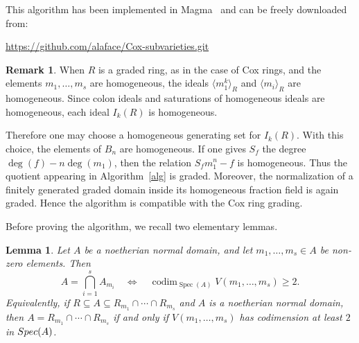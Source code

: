 \documentclass{amsart}
\newtheorem{lemma}[theorem]{Lemma}
\theoremstyle{definition}
\newtheorem{remark}[theorem]{Remark}
\theoremstyle{remark}
\begin{document}
\medskip

This algorithm has been implemented in Magma~\cite{magma} and can be freely
downloaded from:
\begin{center}
 \url{https://github.com/alaface/Cox-subvarieties.git}
\end{center}

\begin{remark}
When $R$ is a graded ring, as in the case of Cox rings, and the elements
$m_1,\dots,m_s$ are homogeneous, the ideals $\langle m_1^k\rangle_R$ and
$\langle m_i\rangle_R$ are homogeneous. Since colon ideals and saturations of
homogeneous ideals are homogeneous, each ideal $I_k(R)$ is homogeneous.

Therefore one may choose a homogeneous generating set for $I_k(R)$. With this
choice, the elements of $B_n$ are homogeneous. If one gives $S_f$ the degree
$\deg(f)-n\deg(m_1)$, then the relation $S_fm_1^n-f$ is homogeneous.
Thus the quotient appearing in Algorithm~\ref{alg} is graded. Moreover, the
normalization of a finitely generated graded domain inside its homogeneous
fraction field is again graded. Hence the algorithm is compatible with the Cox
ring grading.
\end{remark}

Before proving the algorithm, we recall two elementary lemmas.

\begin{lemma}
\label{pro:crit}
Let $A$ be a noetherian normal domain, and let $m_1,\dots,m_s\in A$ be
non-zero elements. Then
\[
A=\bigcap_{i=1}^s A_{m_i}
\quad\Longleftrightarrow\quad
\operatorname{codim}_{\operatorname{Spec}(A)}V(m_1,\dots,m_s)\ge 2.
\]
Equivalently, if $R\subseteq A\subseteq R_{m_1}\cap\cdots\cap R_{m_s}$ and
$A$ is a noetherian normal domain, then $A=R_{m_1}\cap\cdots\cap R_{m_s}$
if and only if $V(m_1,\dots,m_s)$ has codimension at least $2$ in
${\rm Spec}(A)$.
\end{lemma}
\end{document}

